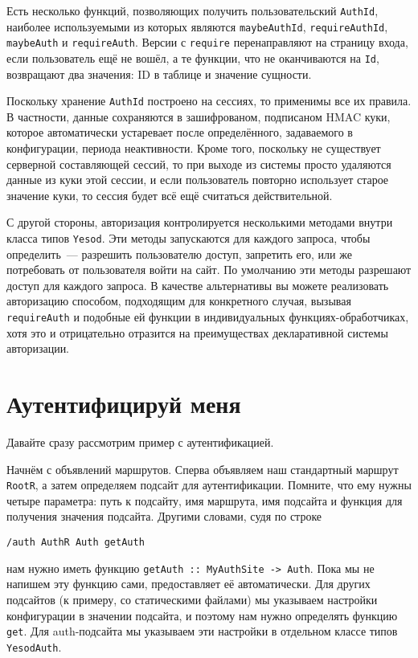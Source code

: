 Есть несколько функций, позволяющих получить пользовательский \lstinline'AuthId', наиболее используемыми из которых являются \lstinline'maybeAuthId', \lstinline'requireAuthId', \lstinline'maybeAuth' и \lstinline'requireAuth'. Версии с \lstinline'require' перенаправляют на страницу входа, если пользователь ещё не вошёл, а те функции, что не оканчиваются на \lstinline'Id', возвращают два значения: ID в таблице и значение сущности.

Поскольку хранение \lstinline'AuthId' построено на сессиях, то применимы все их правила. В частности, данные сохраняются в зашифрованом, подписаном HMAC куки, которое автоматически устаревает после определённого, задаваемого в конфигурации, периода неактивности. Кроме того, поскольку не существует серверной составляющей сессий, то при выходе из системы просто удаляются данные из куки этой сессии, и если пользователь повторно использует старое значение куки, то сессия будет всё ещё считаться действительной.

С другой стороны, авторизация контролируется несколькими методами внутри класса типов \lstinline'Yesod'. Эти методы запускаются для каждого запроса, чтобы определить~--- разрешить пользователю доступ, запретить его, или же потребовать от пользователя войти на сайт. По умолчанию эти методы разрешают доступ для каждого запроса. В качестве альтернативы вы можете реализовать авторизацию способом, подходящим для конкретного случая, вызывая \lstinline'requireAuth' и подобные ей функции в индивидуальных функциях-обработчиках, хотя это и отрицательно отразится на преимуществах декларативной системы авторизации.

\section{Аутентифицируй меня}

Давайте сразу рассмотрим пример с аутентификацией.


Начнём с объявлений маршрутов. Сперва объявляем наш стандартный маршрут \lstinline'RootR', а затем определяем подсайт для аутентификации. Помните, что ему нужны четыре параметра: путь к подсайту, имя маршрута, имя подсайта и функция для получения значения подсайта. Другими словами, судя по строке

\begin{lstlisting}
/auth AuthR Auth getAuth
\end{lstlisting}

нам нужно иметь функцию \lstinline'getAuth :: MyAuthSite -> Auth'. Пока мы не напишем эту функцию сами,  предоставляет её автоматически. Для других подсайтов (к примеру, со статическими файлами) мы указываем настройки конфигурации в значении подсайта, и поэтому нам нужно определять функцию \lstinline'get'. Для auth-подсайта мы указываем эти настройки в отдельном классе типов \lstinline'YesodAuth'.

